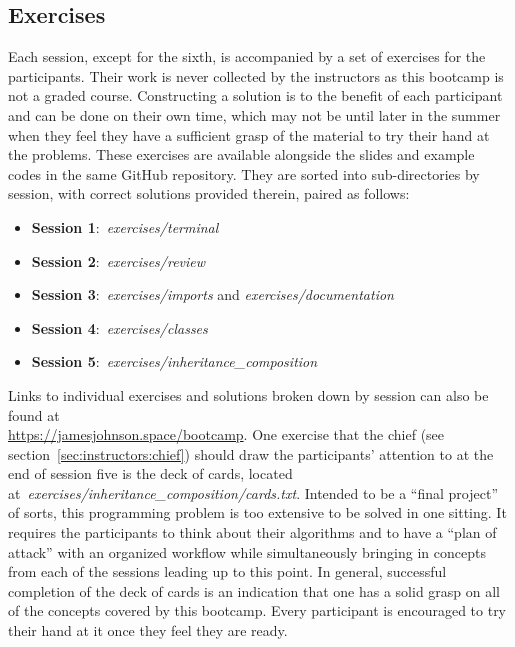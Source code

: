 \subsection{Exercises}
\label{sec:curriculum:exercises}
\noindent
Each session, except for the sixth, is accompanied by a set of exercises for
the participants.
Their work is never collected by the instructors as this bootcamp is not a
graded course.
Constructing a solution is to the benefit of each participant and can be done
on their own time, which may not be until later in the summer when they feel
they have a sufficient grasp of the material to try their hand at the problems.
These exercises are available alongside the slides and example codes in the
same GitHub repository.
They are sorted into sub-directories by session, with correct solutions
provided therein, paired as follows:
\begin{itemize}

	\item \textbf{Session 1}:~\textit{exercises/terminal}

	\item \textbf{Session 2}:~\textit{exercises/review}

	\item \textbf{Session 3}:~\textit{exercises/imports} and
	\textit{exercises/documentation}

	\item \textbf{Session 4}:~\textit{exercises/classes}

	\item \textbf{Session 5}:~\textit{exercises/inheritance\_composition}

\end{itemize}
Links to individual exercises and solutions broken down by session can also be
found at \\ \url{https://jamesjohnson.space/bootcamp}.
One exercise that the chief (see section~\ref{sec:instructors:chief}) should
draw the participants' attention to at the end of session five is the deck
of cards, located at~\textit{exercises/inheritance\_composition/cards.txt}.
Intended to be a ``final project'' of sorts, this programming problem is too
extensive to be solved in one sitting.
It requires the participants to think about their algorithms and to have a
``plan of attack'' with an organized workflow while simultaneously bringing in
concepts from each of the sessions leading up to this point.
In general, successful completion of the deck of cards is an indication that
one has a solid grasp on all of the concepts covered by this bootcamp.
Every participant is encouraged to try their hand at it once they feel they are
ready.

